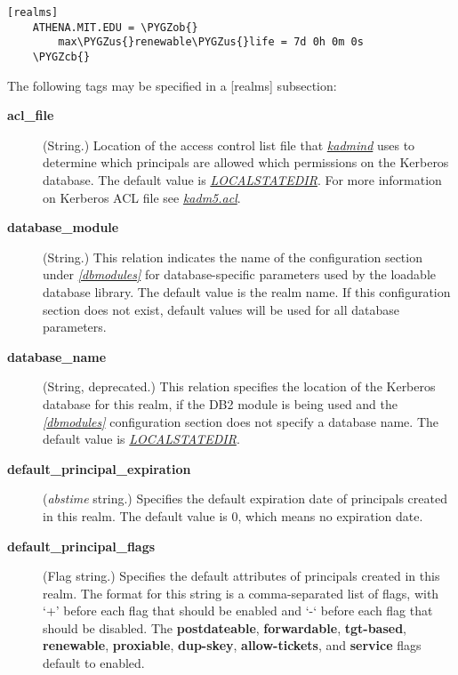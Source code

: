 \documentclass[letterpaper,10pt,english]{sphinxmanual}
\def\PYGZus{\char`\_}
\def\PYGZob{\char`\{}
\def\PYGZcb{\char`\}}
\begin{document}
\begin{Verbatim}[commandchars=\\\{\}]
[realms]
    ATHENA.MIT.EDU = \PYGZob{}
        max\PYGZus{}renewable\PYGZus{}life = 7d 0h 0m 0s
    \PYGZcb{}
\end{Verbatim}

The following tags may be specified in a {[}realms{]} subsection:
\begin{description}
\item[{\textbf{acl\_file}}] \leavevmode
(String.)  Location of the access control list file that
{\hyperref[admin/admin_commands/kadmind:kadmind-8]{\emph{kadmind}}} uses to determine which principals are allowed
which permissions on the Kerberos database.  The default value is
{\hyperref[mitK5defaults:paths]{\emph{LOCALSTATEDIR}}}.  For more information on Kerberos ACL
file see {\hyperref[admin/conf_files/kadm5_acl:kadm5-acl-5]{\emph{kadm5.acl}}}.

\item[{\textbf{database\_module}}] \leavevmode
(String.)  This relation indicates the name of the configuration
section under {\hyperref[admin/conf_files/kdc_conf:dbmodules]{\emph{{[}dbmodules{]}}}} for database-specific parameters
used by the loadable database library.  The default value is the
realm name.  If this configuration section does not exist, default
values will be used for all database parameters.

\item[{\textbf{database\_name}}] \leavevmode
(String, deprecated.)  This relation specifies the location of the
Kerberos database for this realm, if the DB2 module is being used
and the {\hyperref[admin/conf_files/kdc_conf:dbmodules]{\emph{{[}dbmodules{]}}}} configuration section does not specify a
database name.  The default value is {\hyperref[mitK5defaults:paths]{\emph{LOCALSTATEDIR}}}.

\item[{\textbf{default\_principal\_expiration}}] \leavevmode
(\emph{abstime} string.)  Specifies the default expiration date of
principals created in this realm.  The default value is 0, which
means no expiration date.

\item[{\textbf{default\_principal\_flags}}] \leavevmode
(Flag string.)  Specifies the default attributes of principals
created in this realm.  The format for this string is a
comma-separated list of flags, with `+' before each flag that
should be enabled and `-` before each flag that should be
disabled.  The \textbf{postdateable}, \textbf{forwardable}, \textbf{tgt-based},
\textbf{renewable}, \textbf{proxiable}, \textbf{dup-skey}, \textbf{allow-tickets}, and
\textbf{service} flags default to enabled.


\end{description}
\end{document}
